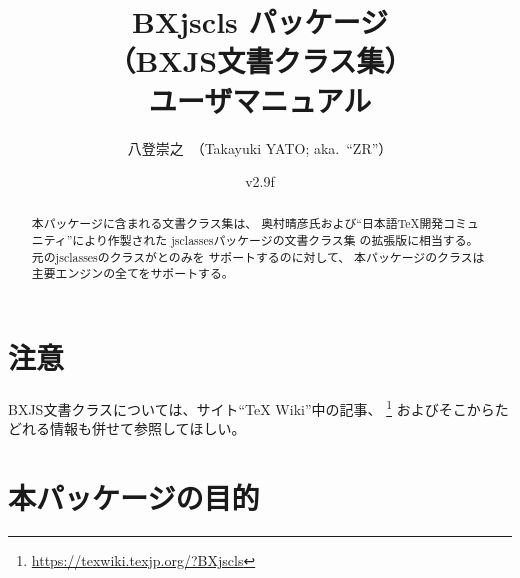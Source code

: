 \documentclass[a4paper]{ltjsarticle}
\newcommand{\PkgVersion}{2.9f}
\newcommand{\PkgDate}{2026/05/28}
\newcommand{\Pkg}[1]{\textsf{#1}}
\begin{document}
\title{\Pkg{BXjscls} パッケージ\\
  （BXJS文書クラス集）\\
  ユーザマニュアル}
\author{八登崇之\ （Takayuki YATO; aka.~``ZR''）}
\date{v\PkgVersion\quad[\PkgDate]}
\maketitle

\begin{abstract}
本パッケージに含まれる文書クラス集は、
奥村晴彦氏および“日本語{\TeX}開発コミュニティ”により作製された
\Pkg{jsclasses}パッケージの文書クラス集
の拡張版に相当する。
元の\Pkg{jsclasses}のクラスが{\pLaTeX}と{\upLaTeX}のみを
サポートするのに対して、
本パッケージのクラスは主要エンジンの全てをサポートする。
\end{abstract}

\tableofcontents

\section*{注意}

BXJS文書クラスについては、サイト“{\TeX} Wiki”中の記事、
\footnote{\url{https://texwiki.texjp.org/?BXjscls}}%
およびそこからたどれる情報も併せて参照してほしい。

\section{本パッケージの目的}
\label{sec:Ovewview}
\end{document}
